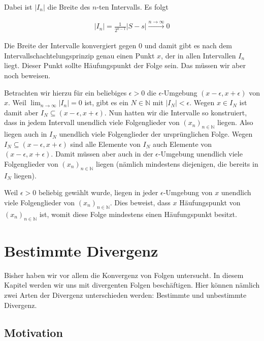 \documentclass[fontsize=9pt,
               parskip=half-,
               DIV=14,
               listof=chapterentry,
               tocflat]{scrbook}
\begin{document}
\begin{proof*}
Dabei ist $|I_{n}|$ die Breite des $n$-ten Intervalls. Es folgt

\begin{align*}
|I_{n}|={\frac {1}{2^{n-1}}}|S-s|{\xrightarrow {n\to \infty }}0
\end{align*}

Die Breite der Intervalle konvergiert gegen $0$ und damit gibt es nach dem Intervallschachtelungsprinzip genau einen Punkt $x$, der in allen Intervallen $I_{n}$ liegt. Dieser Punkt sollte Häufungspunkt der Folge sein. Das müssen wir aber noch beweisen.

Betrachten wir hierzu für ein beliebiges $\epsilon >0$ die $\epsilon $-Umgebung $(x-\epsilon ,x+\epsilon )$ von $x$. Weil $\lim _{n\to \infty }|I_{n}|=0$ ist, gibt es ein $N\in \mathbb {N} $ mit $|I_{N}|<\epsilon $. Wegen $x\in I_{N}$ ist damit aber $I_{N}\subseteq (x-\epsilon ,x+\epsilon )$. Nun hatten wir die Intervalle so konstruiert, dass in jedem Intervall unendlich viele Folgenglieder von $(x_{n})_{n\in \mathbb {N} }$ liegen. Also liegen auch in $I_{N}$ unendlich viele Folgenglieder der ursprünglichen Folge. Wegen $I_{N}\subseteq (x-\epsilon ,x+\epsilon )$ sind alle Elemente von $I_{N}$ auch Elemente von $(x-\epsilon ,x+\epsilon )$. Damit müssen aber auch in der $\epsilon $-Umgebung unendlich viele Folgenglieder von $(x_{n})_{n\in \mathbb {N} }$ liegen (nämlich mindestens diejenigen, die bereits in $I_{N}$ liegen).

Weil $\epsilon >0$ beliebig gewählt wurde, liegen in jeder $\epsilon $-Umgebung von $x$ unendlich viele Folgenglieder von $(x_{n})_{n\in \mathbb {N} }$. Dies beweist, dass $x$ Häufungspunkt von $(x_{n})_{n\in \mathbb {N} }$ ist, womit diese Folge mindestens einen Häufungspunkt besitzt.

\end{proof*}

\chapter{Bestimmte Divergenz}

Bisher haben wir vor allem die Konvergenz von Folgen untersucht. In diesem Kapitel werden wir uns mit divergenten Folgen beschäftigen. Hier können nämlich zwei Arten der Divergenz unterschieden werden: Bestimmte und unbestimmte Divergenz.

\section{Motivation}
\end{document}
